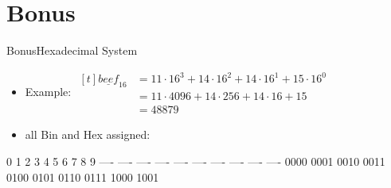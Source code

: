 
\section{Bonus}

\begin{frame}{Bonus}{Hexadecimal System\vspace{0.5cm}}
  \begin{itemize}
    \item \alert{Example:} $\begin{aligned}[t]
        \underline{beef}_{16} &= 11 \cdot 16^3 + 14 \cdot 16^2 + 14 \cdot 16^1 + 15 \cdot 16^0 \\
        &= 11 \cdot 4096 + 14 \cdot 256 + 14 \cdot 16 + 15 \\
        &= 48879
      \end{aligned}$
  \end{itemize}

  \centering
  \begin{itemize}
    \item \alert{all Bin and Hex assigned:}
  \end{itemize}
  \begin{terminal}
  0    1    2    3    4    5    6    7    8    9
  ---- ---- ---- ---- ---- ---- ---- ---- ---- ----
  0000 0001 0010 0011 0100 0101 0110 0111 1000 1001


\end{terminal}
\end{frame}
